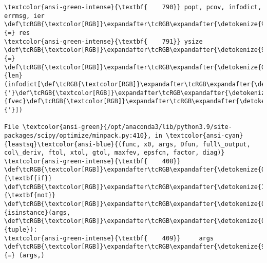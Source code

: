 \documentclass[11pt]{article}
\begin{document}
\begin{Verbatim}[commandchars=\\\{\}, frame=single, framerule=2mm, rulecolor=\color{outerrorbackground}]
\textcolor{ansi-green-intense}{\textbf{    790}} popt, pcov, infodict, errmsg, ier \def\tcRGB{\textcolor[RGB]}\expandafter\tcRGB\expandafter{\detokenize{98,98,98}}{=} res
\textcolor{ansi-green-intense}{\textbf{    791}} ysize \def\tcRGB{\textcolor[RGB]}\expandafter\tcRGB\expandafter{\detokenize{98,98,98}}{=} \def\tcRGB{\textcolor[RGB]}\expandafter\tcRGB\expandafter{\detokenize{0,135,0}}{len}(infodict[\def\tcRGB{\textcolor[RGB]}\expandafter\tcRGB\expandafter{\detokenize{175,0,0}}{'}\def\tcRGB{\textcolor[RGB]}\expandafter\tcRGB\expandafter{\detokenize{175,0,0}}{fvec}\def\tcRGB{\textcolor[RGB]}\expandafter\tcRGB\expandafter{\detokenize{175,0,0}}{'}])

File \textcolor{ansi-green}{/opt/anaconda3/lib/python3.9/site-packages/scipy/optimize/minpack.py:410}, in \textcolor{ansi-cyan}{leastsq}\textcolor{ansi-blue}{(func, x0, args, Dfun, full\_output, col\_deriv, ftol, xtol, gtol, maxfev, epsfcn, factor, diag)}
\textcolor{ansi-green-intense}{\textbf{    408}} \def\tcRGB{\textcolor[RGB]}\expandafter\tcRGB\expandafter{\detokenize{0,135,0}}{\textbf{if}} \def\tcRGB{\textcolor[RGB]}\expandafter\tcRGB\expandafter{\detokenize{175,0,255}}{\textbf{not}} \def\tcRGB{\textcolor[RGB]}\expandafter\tcRGB\expandafter{\detokenize{0,135,0}}{isinstance}(args, \def\tcRGB{\textcolor[RGB]}\expandafter\tcRGB\expandafter{\detokenize{0,135,0}}{tuple}):
\textcolor{ansi-green-intense}{\textbf{    409}}     args \def\tcRGB{\textcolor[RGB]}\expandafter\tcRGB\expandafter{\detokenize{98,98,98}}{=} (args,)

\end{Verbatim}
\end{document}
